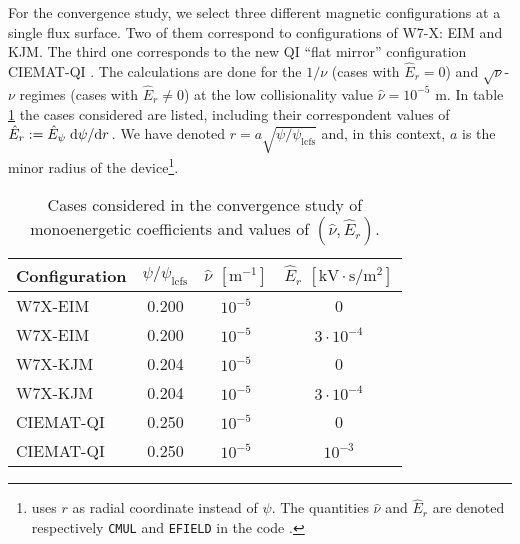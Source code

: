 For the convergence study, we select three different magnetic configurations at a single flux surface. Two of them correspond to configurations of W7-X: EIM and KJM. The third one corresponds to the new QI ``flat mirror'' \cite{velasco2023robust} configuration CIEMAT-QI \cite{Sanchez_2023}. The calculations are done for the $1/\nu$ (cases with $\hat{E}_r=0$) and $\sqrt{\nu}$-$\nu$ regimes \cite{dherbemont2022} (cases with $\hat{E}_r\ne 0$) at the low collisionality value $\hat{\nu}=10^{-5}$ m. In table \ref{tab:Convergence_cases} the cases considered are listed, including their correspondent values of $\hat{E}_r:= \hat{E}_\psi\dv*{\psi}{r}$. We have denoted $r = a \sqrt{\psi/\psi_{\text{lcfs}}}$ and, in this context, $a$ is the minor radius of the device\footnote{{\DKES} uses $r$ as radial coordinate instead of $\psi$. The quantities $\hat{\nu}$ and $\hat{E}_r$ are denoted respectively \texttt{CMUL} and \texttt{EFIELD} in the code {\DKES}.}.
\begin{table}[h]
	\centering
	\begin{tabular}{@{}lccc@{}}
		\toprule
		Configuration & $\psi/\psi_{\text{lcfs}}$ & $\hat{\nu}$ $[\text{m}^{-1}]$ & $\hat{E}_r$  $[\text{kV}\cdot\text{s}/\text{m}^2]$   \\ \midrule
		W7X-EIM       & 0.200                     & $10^{-5}$   & 0 \\
		W7X-EIM       & 0.200                     & $10^{-5}$   & $3\cdot10^{-4}$ \\
		W7X-KJM       & 0.204                     & $10^{-5}$   & 0 \\
		W7X-KJM       & 0.204                     & $10^{-5}$   & $3\cdot10^{-4}$ \\ 
		CIEMAT-QI     & 0.250                     & $10^{-5}$   & 0       \\
		CIEMAT-QI     & 0.250                     & $10^{-5}$   & $10^{-3}$       \\
		\bottomrule
	\end{tabular}
	\caption{Cases considered in the convergence study of monoenergetic coefficients and values of $(\hat{\nu},\hat{E}_r)$.}
	\label{tab:Convergence_cases}
\end{table}

